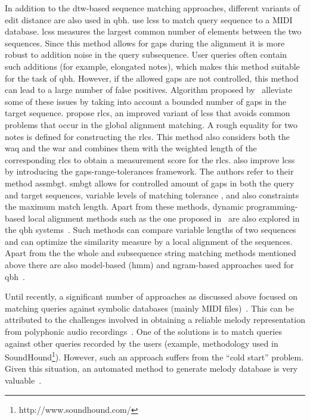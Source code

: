 In addition to the \gls{dtw}-based sequence matching approaches, different variants of edit distance are also used in \gls{qbh}. \cite{uitdenbogerd1999melodic} use \gls{lcss} to match query sequence to a MIDI database. \gls{lcss} measures the largest common number of elements between the two sequences. Since this method allows for gaps during the alignment it is more robust to addition noise in the query subsequence. User queries often contain such additions (for example, elongated notes), which makes this method suitable for the task of \gls{qbh}. However, if the allowed gaps are not controlled, this method can lead to a large number of false positives. Algorithm proposed by~\cite{iliopoulos2002string} alleviate some of these issues by taking into account a bounded number of gaps in the target sequence. \cite{lin2011music} propose \gls{rlcs}, an improved variant of \gls{lcss} that avoids common problems that occur in the global alignment matching. A rough equality for two notes is defined for constructing the \gls{rlcs}. This method also considers both the \gls{waq} and the \gls{war} and combines them with the weighted length of the corresponding \gls{rlcs} to obtain a measurement score for the \gls{rlcs}. \cite{kotsifakos2011subsequence} also improve \gls{lcss} by introducing the gaps-range-tolerances framework. The authors refer to their method as\gls{smbgt}. \gls{smbgt} allows for controlled amount of gaps in both the query and target sequences, variable levels of matching tolerance , and also constraints the maximum match length. Apart from these methods, dynamic programming-based local alignment methods such as the one proposed in~\cite{smith1981identification} are also explored in the \gls{qbh} systems~\cite{uitdenbogerd1999melodic}. Such methods can compare variable lengths of two sequences and can optimize the similarity measure by a local alignment of the sequences. Apart from the the whole and subsequence string matching methods mentioned above there are also model-based (\gls{hmm}) and \gls{ngram}-based approaches used for \gls{qbh}~\citep{durey2001melody,jang2005continuous,uitdenbogerd1999melodic,dannenberg2007comparative}. 

Until recently, a significant number of approaches as discussed above focused on matching queries against symbolic databases (mainly MIDI files)~\citep{kotsifakos2012survey}. This can be attributed to the challenges involved in obtaining a reliable melody representation from polyphonic audio recordings~\citep{Salamon2012}. One of the solutions is to match queries against other queries recorded by the users (example, methodology used in SoundHound\footnote{http://www.soundhound.com/}). However, such an approach suffers from the ``cold start'' problem. Given this situation, an automated method to generate melody database is very valuable~\citep{salamon2013tonal}. 

